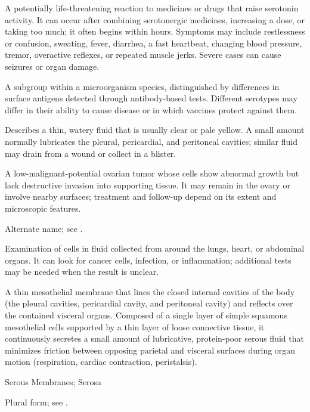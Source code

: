  A potentially life-threatening reaction to medicines or drugs that raise serotonin activity. It can occur after combining serotonergic medicines, increasing a dose, or taking too much; it often begins within hours. Symptoms may include restlessness or confusion, sweating, fever, diarrhea, a fast heartbeat, changing blood pressure, tremor, overactive reflexes, or repeated muscle jerks. Severe cases can cause seizures or organ damage.

 A subgroup within a microorganism species, distinguished by differences in surface antigens detected through antibody-based tests. Different serotypes may differ in their ability to cause disease or in which vaccines protect against them.

 Describes a thin, watery fluid that is usually clear or pale yellow. A small amount normally lubricates the pleural, pericardial, and peritoneal cavities; similar fluid may drain from a wound or collect in a blister.

 A low-malignant-potential ovarian tumor whose cells show abnormal growth but lack destructive invasion into supporting tissue. It may remain in the ovary or involve nearby surfaces; treatment and follow-up depend on its extent and microscopic features.

 Alternate name; see .

 Examination of cells in fluid collected from around the lungs, heart, or abdominal organs. It can look for cancer cells, infection, or inflammation; additional tests may be needed when the result is unclear.

 A thin mesothelial membrane that lines the closed internal cavities of the body (the pleural cavities, pericardial cavity, and peritoneal cavity) and reflects over the contained visceral organs. Composed of a single layer of simple squamous mesothelial cells supported by a thin layer of loose connective tissue, it continuously secretes a small amount of lubricative, protein-poor serous fluid that minimizes friction between opposing parietal and visceral surfaces during organ motion (respiration, cardiac contraction, peristalsis).

\synonyms
Serous Membranes; Serosa

 Plural form; see .

